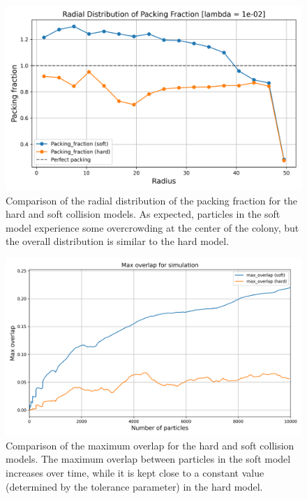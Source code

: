 \documentclass[conference]{IEEEtran}
\begin{document}
\begin{figure}[h]
    \centering
    \includegraphics[width=\linewidth]{figures/comparisons/radial_distribution_packing_fraction.png}
    \caption{Comparison of the radial distribution of the packing fraction for the hard and soft collision models. As expected, particles in the soft model experience some overcrowding at the center of the colony, but the overall distribution is similar to the hard model.}
    \label{figure:radial_distribution_packing_fraction}
\end{figure}

\begin{figure}[h]
    \centering
    \includegraphics[width=\linewidth]{figures/comparisons/max_overlap_simulation.png}
    \caption{Comparison of the maximum overlap for the hard and soft collision models. The maximum overlap between particles in the soft model increases over time, while it is kept close to a constant value (determined by the tolerance parameter) in the hard model.}
    \label{figure:max_overlap_simulation}
\end{figure}
\end{document}
